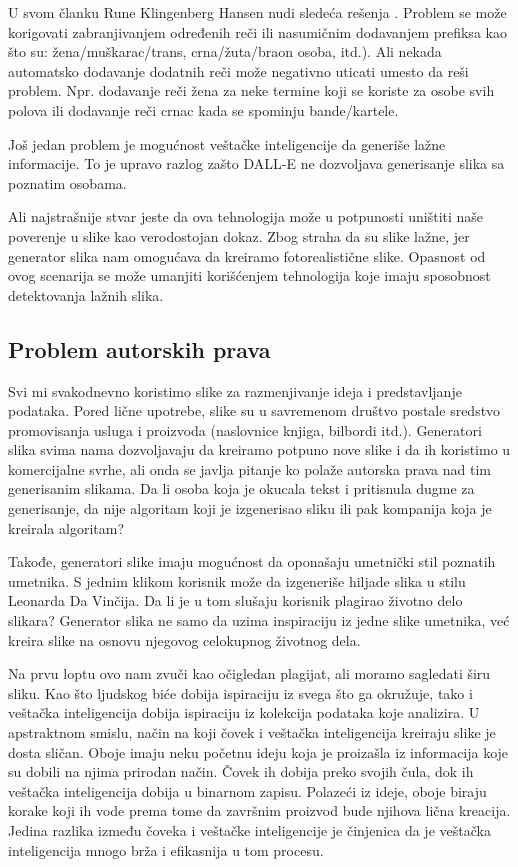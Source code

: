 \documentclass[12pt, letterpaper]{article}
\begin{document}
U svom članku Rune Klingenberg Hansen nudi sledeća rešenja \cite{kljuc1}. Problem se može korigovati zabranjivanjem određenih reči ili nasumičnim dodavanjem prefiksa kao što su: žena/muškarac/trans, crna/žuta/braon osoba, itd.). Ali nekada automatsko dodavanje dodatnih reči može negativno uticati umesto da reši problem. Npr. dodavanje reči žena za neke termine koji se koriste za osobe svih polova ili dodavanje reči crnac kada se spominju bande/kartele.

Još jedan problem je mogućnost veštačke inteligencije da generiše lažne informacije. To je upravo razlog zašto DALL-E \cite{poznate} ne dozvoljava generisanje slika sa poznatim osobama.

Ali najstrašnije stvar jeste da ova tehnologija može u potpunosti uništiti naše poverenje u slike kao verodostojan dokaz. Zbog straha da su slike lažne, jer generator slika nam omogućava da kreiramo fotorealistične slike. Opasnost od ovog scenarija se može umanjiti korišćenjem tehnologija koje imaju sposobnost detektovanja lažnih slika.



\subsection{Problem autorskih prava}

Svi mi svakodnevno koristimo slike za razmenjivanje ideja i predstavljanje podataka. Pored lične upotrebe, slike su u savremenom društvo postale sredstvo promovisanja usluga i proizvoda (naslovnice knjiga, bilbordi itd.). Generatori slika svima nama dozvoljavaju da kreiramo potpuno nove slike i da ih koristimo u komercijalne svrhe, ali onda se javlja pitanje ko polaže autorska prava nad tim generisanim slikama. Da li osoba koja je okucala tekst i pritisnula dugme za generisanje, da nije algoritam koji je izgenerisao sliku ili pak kompanija koja je kreirala algoritam?

Takođe, generatori slike imaju mogućnost da oponašaju umetnički stil poznatih umetnika. S jednim klikom korisnik može da izgeneriše hiljade slika u stilu Leonarda Da Vinčija. Da li je u tom slušaju korisnik plagirao životno delo slikara? Generator slika ne samo da uzima inspiraciju iz jedne slike umetnika, već kreira slike na osnovu njegovog celokupnog životnog dela.

Na prvu loptu ovo nam zvuči kao očigledan plagijat, ali moramo sagledati širu sliku. Kao što ljudskog biće dobija ispiraciju iz svega što ga okružuje, tako i veštačka inteligencija dobija ispiraciju iz kolekcija podataka koje analizira. U apstraktnom smislu, način na koji čovek i veštačka inteligencija kreiraju slike je dosta sličan. Oboje imaju neku početnu ideju koja je proizašla iz informacija koje su dobili na njima prirodan način. Čovek ih dobija preko svojih čula, dok ih veštačka inteligencija dobija u binarnom zapisu. Polazeći iz ideje, oboje biraju korake koji ih vode prema tome da završnim proizvod bude njihova lična kreacija. Jedina razlika između čoveka i veštačke inteligencije je činjenica da je veštačka inteligencija mnogo brža i efikasnija u tom procesu.
\end{document}
